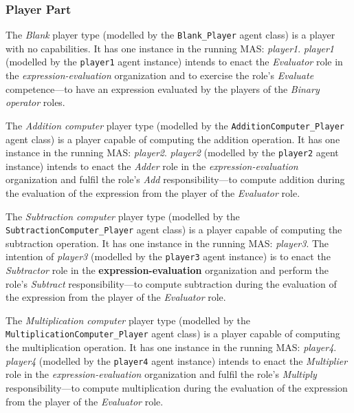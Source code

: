 \subsubsection*{Player Part}

The \textit{Blank} player type (modelled by the \texttt{Blank\_Player} agent class) is a player with no capabilities.
It has one instance in the running MAS: \textit{player1}.
\textit{player1} (modelled by the \texttt{player1} agent instance) intends to enact the \textit{Evaluator} role in the \textit{expression-evaluation} organization and to exercise the role's \textit{Evaluate} competence---to have an expression evaluated by the players of the \textit{Binary operator} roles.

The \textit{Addition computer} player type (modelled by the \texttt{AdditionComputer\_Player} agent class) is a player capable of computing the addition operation.
It has one instance in the running MAS: \textit{player2}.
\textit{player2} (modelled by the \texttt{player2} agent instance) intends to enact the \textit{Adder} role in the \textit{expression-evaluation} organization and fulfil the role's \textit{Add} responsibility---to compute addition during the evaluation of the expression from the player of the \textit{Evaluator} role.

The \textit{Subtraction computer} player type (modelled by the \texttt{SubtractionComputer\_Player} agent class) is a player capable of computing the subtraction operation.
It has one instance in the running MAS: \textit{player3}.
The intention of \textit{player3} (modelled by the \texttt{player3} agent instance) is to enact the \textit{Subtractor} role in the \textbf{expression-evaluation} organization and perform the role's \textit{Subtract} responsibility---to compute subtraction during the evaluation of the expression from the player of the  \textit{Evaluator} role.

The \textit{Multiplication computer} player type (modelled by the \texttt{MultiplicationComputer\_Player} agent class) is a player capable of computing the multiplication operation.
It has one instance in the running MAS: \textit{player4}.
\textit{player4} (modelled by the \texttt{player4} agent instance) intends to enact the \textit{Multiplier} role in the \textit{expression-evaluation} organization and fulfil the role's \textit{Multiply} responsibility---to compute multiplication during the evaluation of the expression from the player of the \textit{Evaluator} role.

